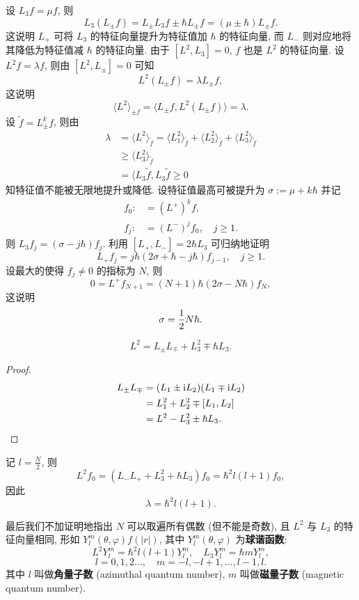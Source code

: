 \vspace{0ex}
设 $ L_3f=\mu f $, 则
\[ L_3(L_{\pm}f)=L_{\pm}L_3 f\pm\hbar L_{\pm}f=(\mu\pm\hbar)L_{\pm}f. \]
这说明 $ L_+ $ 可将 $ L_3 $ 的特征向量提升为特征值加 $ \hbar $ 的特征向量, 而 $ L_- $ 则对应地将其降低为特征值减 $ \hbar $ 的特征向量. 由于 $[L^2,L_3]=0$, $f$ 也是 $L^2$ 的特征向量. 设 $ L^2 f=\lambda f $, 则由 $[L^2,L_{\pm}]=0$ 可知
\[ L^2(L_{\pm}f)=\lambda L_{\pm}f, \]
这说明
\[ \langle L^2 \rangle_{\pm f}=\langle L_{\pm}f,L^2(L_{\pm} f) \rangle=\lambda. \]
设 $\tilde{f}={L_{\pm}^k}f$, 则由
\begin{align*}
    \lambda&=\langle L^2\rangle_{\tilde{f}}=\langle L_1^2\rangle_{\tilde{f}}+\langle L_2^2\rangle_{\tilde{f}}+\langle L_3^2\rangle_{\tilde{f}}\\ 
    &\geqslant\langle L_3^2\rangle_{\tilde{f}}\\ 
    &=\langle L_3 \tilde{f},L_3 \tilde{f}\geqslant 0
\end{align*}
知特征值不能被无限地提升或降低. 设特征值最高可被提升为 $ \sigma:=\mu+k\hbar $ 并记
\begin{align*}
    f_0:&=(L^+)^kf,\\ 
    f_j:&=(L^-)^jf_0,\quad j\geqslant 1.
\end{align*}
则 $ L_3f_j=(\sigma-j\hbar)f_j $. 利用 $ [L_+,L_-]=2\hbar L_3 $ 可归纳地证明
\[ L_+f_j=j\hbar(2\sigma+\hbar-j\hbar)f_{j-1},\quad j\geqslant 1. \]
设最大的使得 $ f_j\neq 0 $ 的指标为 $ N $, 则
\[ 0=L^+f_{N+1}=(N+1)\hbar(2\sigma-N\hbar)f_N, \]
这说明
\[ \sigma=\frac{1}{2}N\hbar.\vspace{2ex} \]
\begin{proposition}\keepline
    \[ L^2=L_{\pm}L_{\mp}+L_3^2\mp\hbar L_3. \]
\end{proposition}
\vspace{0ex}
\begin{proof}\keepline
    \begin{align*}
        L_{\pm}L_{\mp} &= (L_1\pm\mathrm{i}L_2)(L_1\mp\mathrm{i}L_2)\\ 
        &= L_1^2+L_2^2\mp[L_1,L_2]\\ 
        &= L^2-L_3^2\pm\hbar L_3.\qedhere
    \end{align*}
\end{proof}
记 $ \displaystyle l=\frac{N}{2} $, 则
\[ L^2f_0=(L_-L_++L_3^2+\hbar L_3)f_0=\hbar^2 l(l+1)f_0, \]
因此
\[ \lambda = \hbar^2 l(l+1). \]

最后我们不加证明地指出 $ N $ 可以取遍所有偶数 (但不能是奇数), 且 $ L^2 $ 与 $ L_3 $ 的特征向量相同, 形如 $ Y_l^m(\theta,\varphi)f(|r|) $, 其中 $ Y^m_l(\theta,\varphi) $ 为{\bf 球谐函数}:
\[ L^2Y^m_l=\hbar^2l(l+1)Y^m_l,\quad L_3Y^m_l=\hbar mY^m_l, \]
\[ l=0,1,2\dots,\quad m=-l,-l+1,\dots,l-1,l. \]
其中 $ l $ 叫做{\bf 角量子数} (azimuthal quantum number), $ m $ 叫做{\bf 磁量子数} (magnetic quantum number).

